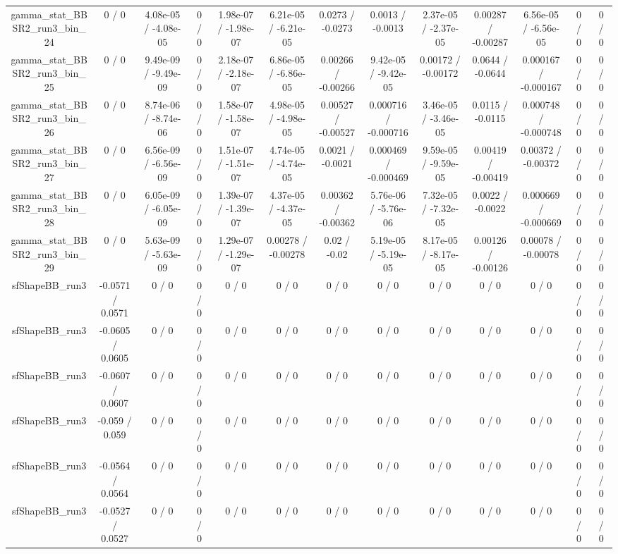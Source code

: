 \documentclass[10pt]{article}
\begin{document}
\begin{table}[htbp]
\begin{center}
\begin{tabular}{|c|c|c|c|c|c|c|c|c|c|c|c|c|}
  gamma_stat_BBSR2_run3_bin_24 & 0 / 0 & 4.08e-05 / -4.08e-05 & 0 / 0 & 1.98e-07 / -1.98e-07 & 6.21e-05 / -6.21e-05 & 0.0273 / -0.0273 & 0.0013 / -0.0013 & 2.37e-05 / -2.37e-05 & 0.00287 / -0.00287 & 6.56e-05 / -6.56e-05 & 0 / 0 & 0 / 0 \\ 
  gamma_stat_BBSR2_run3_bin_25 & 0 / 0 & 9.49e-09 / -9.49e-09 & 0 / 0 & 2.18e-07 / -2.18e-07 & 6.86e-05 / -6.86e-05 & 0.00266 / -0.00266 & 9.42e-05 / -9.42e-05 & 0.00172 / -0.00172 & 0.0644 / -0.0644 & 0.000167 / -0.000167 & 0 / 0 & 0 / 0 \\ 
  gamma_stat_BBSR2_run3_bin_26 & 0 / 0 & 8.74e-06 / -8.74e-06 & 0 / 0 & 1.58e-07 / -1.58e-07 & 4.98e-05 / -4.98e-05 & 0.00527 / -0.00527 & 0.000716 / -0.000716 & 3.46e-05 / -3.46e-05 & 0.0115 / -0.0115 & 0.000748 / -0.000748 & 0 / 0 & 0 / 0 \\ 
  gamma_stat_BBSR2_run3_bin_27 & 0 / 0 & 6.56e-09 / -6.56e-09 & 0 / 0 & 1.51e-07 / -1.51e-07 & 4.74e-05 / -4.74e-05 & 0.0021 / -0.0021 & 0.000469 / -0.000469 & 9.59e-05 / -9.59e-05 & 0.00419 / -0.00419 & 0.00372 / -0.00372 & 0 / 0 & 0 / 0 \\ 
  gamma_stat_BBSR2_run3_bin_28 & 0 / 0 & 6.05e-09 / -6.05e-09 & 0 / 0 & 1.39e-07 / -1.39e-07 & 4.37e-05 / -4.37e-05 & 0.00362 / -0.00362 & 5.76e-06 / -5.76e-06 & 7.32e-05 / -7.32e-05 & 0.0022 / -0.0022 & 0.000669 / -0.000669 & 0 / 0 & 0 / 0 \\ 
  gamma_stat_BBSR2_run3_bin_29 & 0 / 0 & 5.63e-09 / -5.63e-09 & 0 / 0 & 1.29e-07 / -1.29e-07 & 0.00278 / -0.00278 & 0.02 / -0.02 & 5.19e-05 / -5.19e-05 & 8.17e-05 / -8.17e-05 & 0.00126 / -0.00126 & 0.00078 / -0.00078 & 0 / 0 & 0 / 0 \\ 
  sfShapeBB_run3 & -0.0571 / 0.0571 & 0 / 0 & 0 / 0 & 0 / 0 & 0 / 0 & 0 / 0 & 0 / 0 & 0 / 0 & 0 / 0 & 0 / 0 & 0 / 0 & 0 / 0 \\ 
  sfShapeBB_run3 & -0.0605 / 0.0605 & 0 / 0 & 0 / 0 & 0 / 0 & 0 / 0 & 0 / 0 & 0 / 0 & 0 / 0 & 0 / 0 & 0 / 0 & 0 / 0 & 0 / 0 \\ 
  sfShapeBB_run3 & -0.0607 / 0.0607 & 0 / 0 & 0 / 0 & 0 / 0 & 0 / 0 & 0 / 0 & 0 / 0 & 0 / 0 & 0 / 0 & 0 / 0 & 0 / 0 & 0 / 0 \\ 
  sfShapeBB_run3 & -0.059 / 0.059 & 0 / 0 & 0 / 0 & 0 / 0 & 0 / 0 & 0 / 0 & 0 / 0 & 0 / 0 & 0 / 0 & 0 / 0 & 0 / 0 & 0 / 0 \\ 
  sfShapeBB_run3 & -0.0564 / 0.0564 & 0 / 0 & 0 / 0 & 0 / 0 & 0 / 0 & 0 / 0 & 0 / 0 & 0 / 0 & 0 / 0 & 0 / 0 & 0 / 0 & 0 / 0 \\ 
  sfShapeBB_run3 & -0.0527 / 0.0527 & 0 / 0 & 0 / 0 & 0 / 0 & 0 / 0 & 0 / 0 & 0 / 0 & 0 / 0 & 0 / 0 & 0 / 0 & 0 / 0 & 0 / 0 \\ 

\end{tabular}
\end{center}
\end{table}
\end{document}
